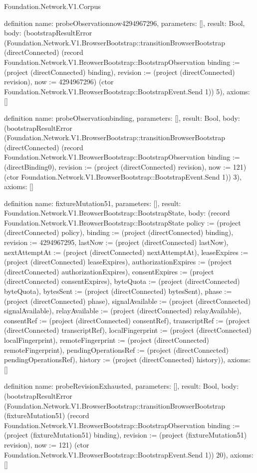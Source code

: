 \begin{lexlean}{Foundation.Network.V1.Corpus}
\begin{semanticmodule}
definition{
  name: probeObservationnow4294967296,
  parameters: [],
  result: Bool,
  body: (bootstrapResultError (Foundation.Network.V1.BrowserBootstrap::transitionBrowserBootstrap (directConnected) (record Foundation.Network.V1.BrowserBootstrap::BootstrapObservation {binding := (project (directConnected) binding), revision := (project (directConnected) revision), now := 4294967296}) (ctor Foundation.Network.V1.BrowserBootstrap::BootstrapEvent.Send 1)) 5),
  axioms: []
}

definition{
  name: probeObservationbinding,
  parameters: [],
  result: Bool,
  body: (bootstrapResultError (Foundation.Network.V1.BrowserBootstrap::transitionBrowserBootstrap (directConnected) (record Foundation.Network.V1.BrowserBootstrap::BootstrapObservation {binding := (directBinding0), revision := (project (directConnected) revision), now := 121}) (ctor Foundation.Network.V1.BrowserBootstrap::BootstrapEvent.Send 1)) 3),
  axioms: []
}

definition{
  name: fixtureMutation51,
  parameters: [],
  result: Foundation.Network.V1.BrowserBootstrap::BootstrapState,
  body: (record Foundation.Network.V1.BrowserBootstrap::BootstrapState {policy := (project (directConnected) policy), binding := (project (directConnected) binding), revision := 4294967295, lastNow := (project (directConnected) lastNow), nextAttemptAt := (project (directConnected) nextAttemptAt), leaseExpires := (project (directConnected) leaseExpires), authorizationExpires := (project (directConnected) authorizationExpires), consentExpires := (project (directConnected) consentExpires), byteQuota := (project (directConnected) byteQuota), bytesSent := (project (directConnected) bytesSent), phase := (project (directConnected) phase), signalAvailable := (project (directConnected) signalAvailable), relayAvailable := (project (directConnected) relayAvailable), consentRef := (project (directConnected) consentRef), transcriptRef := (project (directConnected) transcriptRef), localFingerprint := (project (directConnected) localFingerprint), remoteFingerprint := (project (directConnected) remoteFingerprint), pendingOperationsRef := (project (directConnected) pendingOperationsRef), history := (project (directConnected) history)}),
  axioms: []
}

definition{
  name: probeRevisionExhausted,
  parameters: [],
  result: Bool,
  body: (bootstrapResultError (Foundation.Network.V1.BrowserBootstrap::transitionBrowserBootstrap (fixtureMutation51) (record Foundation.Network.V1.BrowserBootstrap::BootstrapObservation {binding := (project (fixtureMutation51) binding), revision := (project (fixtureMutation51) revision), now := 121}) (ctor Foundation.Network.V1.BrowserBootstrap::BootstrapEvent.Send 1)) 20),
  axioms: []
}


\end{semanticmodule}
\end{lexlean}
